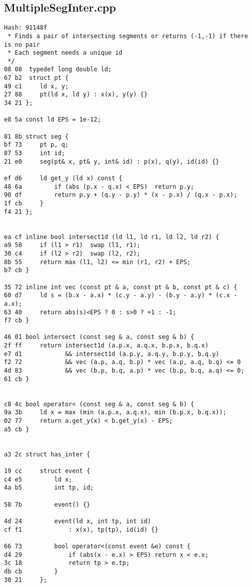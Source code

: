 \documentclass[11pt, a4paper, twoside]{article}
\begin{document}
\subsection{MultipleSegInter.cpp}
\begin{lstlisting}
Hash: 91148f
 * Finds a pair of intersecting segments or returns (-1,-1) if there is no pair
 * Each segment needs a unique id
 */
08 08  typedef long double ld;
67 b2  struct pt {
49 c1     ld x, y;
27 88     pt(ld x, ld y) : x(x), y(y) {}
34 21 };

e8 5a const ld EPS = 1e-12;

81 8b struct seg {
bf 73     pt p, q;
87 53     int id;
21 e0     seg(pt& x, pt& y, int& id) : p(x), q(y), id(id) {}
       
ef d6     ld get_y (ld x) const {
48 6a         if (abs (p.x - q.x) < EPS)  return p.y;
90 df         return p.y + (q.y - p.y) * (x - p.x) / (q.x - p.x);
1f cb     }
f4 21 };
 
 
ea cf inline bool intersect1d (ld l1, ld r1, ld l2, ld r2) {
a9 58     if (l1 > r1)  swap (l1, r1);
30 c4     if (l2 > r2)  swap (l2, r2);
8b 55     return max (l1, l2) <= min (r1, r2) + EPS;
b7 cb }
 
35 72 inline int vec (const pt & a, const pt & b, const pt & c) {
60 d7     ld s = (b.x - a.x) * (c.y - a.y) - (b.y - a.y) * (c.x - a.x);
63 40     return abs(s)<EPS ? 0 : s>0 ? +1 : -1;
f7 cb }
 
46 01 bool intersect (const seg & a, const seg & b) {
2f ff     return intersect1d (a.p.x, a.q.x, b.p.x, b.q.x)
e7 d1            && intersect1d (a.p.y, a.q.y, b.p.y, b.q.y)
f2 72            && vec (a.p, a.q, b.p) * vec (a.p, a.q, b.q) <= 0
4d 83            && vec (b.p, b.q, a.p) * vec (b.p, b.q, a.q) <= 0;
61 cb }
 
 
c8 4c bool operator< (const seg & a, const seg & b) {
9a 3b     ld x = max (min (a.p.x, a.q.x), min (b.p.x, b.q.x));
02 77     return a.get_y(x) < b.get_y(x) - EPS;
a5 cb }
 
 
a3 2c struct has_inter {
       
19 cc     struct event {
c4 e5         ld x;
4a b5         int tp, id;
       
58 7b         event() {}
       
4d 24         event(ld x, int tp, int id)
cf f1             : x(x), tp(tp), id(id) {}
       
66 73         bool operator<(const event &e) const {
d4 29             if (abs(x - e.x) > EPS) return x < e.x;
3c 18             return tp > e.tp;
db cb         }
30 21     };
       

\end{lstlisting}
\end{document}
